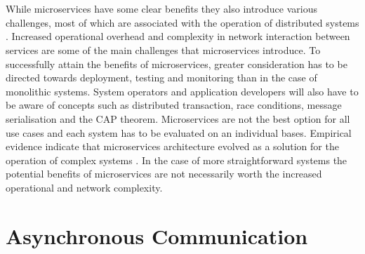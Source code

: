 \\ \\
While microservices have some clear benefits they also introduce various challenges, most of which are associated with the operation of distributed systems \cite{deutsch2004eight}. Increased operational overhead and complexity in network interaction between services are some of the main challenges that microservices introduce. To successfully attain the benefits of microservices, greater consideration has to be directed towards deployment, testing and monitoring than in the case of monolithic systems. System operators and application developers will also have to be aware of concepts such as distributed transaction, race conditions, message serialisation and the CAP theorem. Microservices are not the best option for all use cases and each system has to be evaluated on an individual bases. Empirical evidence indicate that microservices architecture evolved as a solution for the operation of complex systems \cite{thones2015microservices, microservicesNetflix}. In the case of more straightforward systems the potential benefits of microservices are not necessarily worth the increased operational and network complexity.

\section{Asynchronous Communication}

